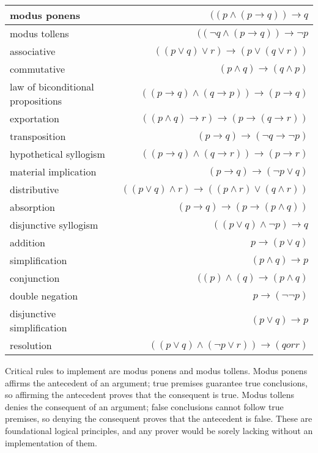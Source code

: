 \documentclass{l4proj}
\begin{document}
\begin{center}
\begin{tabular}{| l | r |} 
\hline modus ponens & \(((p \land (p \rightarrow q)) \rightarrow q\) \\
\hline modus tollens & \(((\neg q \land (p \rightarrow q)) \rightarrow \neg p\) \\
\hline associative & \(((p \lor q) \lor r) \rightarrow (p \lor (q \lor r))\) \\
\hline commutative & \((p \land q) \rightarrow (q \land p)\) \\
\hline law of biconditional propositions & \(((p \rightarrow q) \land (q \rightarrow p)) \rightarrow (p \rightarrow q)\) \\
\hline exportation & \(((p \land q) \rightarrow r) \rightarrow (p \rightarrow (q \rightarrow r))\) \\
\hline transposition & \((p \rightarrow q) \rightarrow (\neg q \rightarrow \neg p)\) \\
\hline hypothetical syllogism & \(((p \rightarrow q) \land (q \rightarrow r)) \rightarrow (p \rightarrow r)\) \\
\hline material implication & \((p \rightarrow q) \rightarrow (\neg p \lor q)\) \\
\hline distributive & \(((p \lor q) \land r) \rightarrow ((p \land r) \lor (q \land r))\) \\
\hline absorption & \((p \rightarrow q) \rightarrow (p \rightarrow (p \land q))\) \\
\hline disjunctive syllogism & \(((p \lor q) \land \neg p) \rightarrow q\) \\
\hline addition & \(p \rightarrow (p \lor q)\) \\
\hline simplification & \((p \land q) \rightarrow p\) \\
\hline conjunction & \(((p) \land (q) \rightarrow (p \land q)\) \\
\hline double negation & \(p \rightarrow (\neg \neg p)\) \\
\hline disjunctive simplification & \((p \lor q) \rightarrow p\) \\
\hline resolution & \(((p \lor q) \land (\neg p \lor r)) \rightarrow (q or r)\) \\
\hline
\end{tabular}
\end{center}

Critical rules to implement are modus ponens and modus tollens. Modus ponens affirms the antecedent of an argument; true premises guarantee true conclusions, so affirming the antecedent proves that the consequent is true. Modus tollens denies the consequent of an argument; false conclusions cannot follow true premises, so denying the consequent proves that the antecedent is false. These are foundational logical principles, and any prover would be sorely lacking without an implementation of them. 
\end{document}

